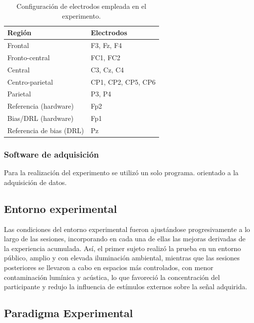 \begin{table}[h]
    \centering
    \begin{tabular}{l|l}
        \textbf{Región} & \textbf{Electrodos} \\
        \hline\hline
        Frontal           & F3, Fz, F4 \\
        Fronto-central    & FC1, FC2 \\
        Central           & C3, Cz, C4 \\
        Centro-parietal   & CP1, CP2, CP5, CP6 \\
        Parietal          & P3, P4 \\
        \hline
        Referencia (hardware)     & Fp2 \\
        Bias/DRL (hardware)       & Fp1 \\
        Referencia de bias (DRL)  & Pz \\
    \end{tabular}
    \caption{Configuración de electrodos empleada en el experimento.}
    \label{tab:canales}
\end{table}

\subsubsection{Software de adquisición}

Para la realización del experimento se utilizó un solo programa.
orientado a la adquisición de datos.

\subsection{Entorno experimental}
\label{subsec:Entorno}

Las condiciones del entorno experimental fueron ajustándose progresivamente a lo largo de las sesiones, incorporando en cada una de ellas las mejoras derivadas de la experiencia acumulada. Así, el primer sujeto realizó la prueba en un entorno público, amplio y con elevada iluminación ambiental, mientras que las sesiones posteriores se llevaron a cabo en espacios más controlados, con menor contaminación lumínica y acústica, lo que favoreció la concentración del participante y redujo la influencia de estímulos externos sobre la señal adquirida.

\subsection{Paradigma Experimental}
\label{subsec:paradigma}

